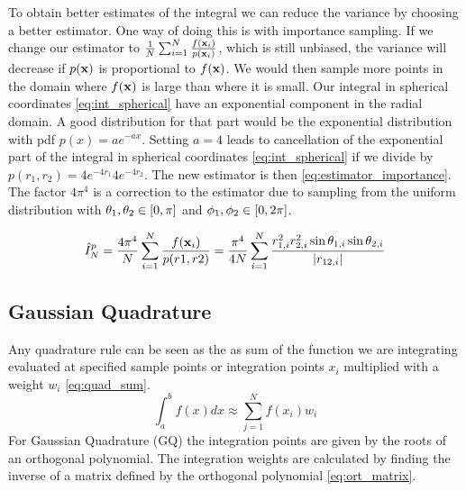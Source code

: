 To obtain better estimates of the integral we can reduce the variance by
choosing a better estimator.
One way of doing this is with importance sampling. If we change our estimator to
$\frac{1}{N} \sum_{i=1}^{N} \frac{f(\mathbf{x}_i)}{p(\mathbf{x}_i)}$, which is still unbiased, the
variance will decrease if $p(\mathbf{x})$ is proportional to $f(\mathbf{x})$. We would then sample
more points in the domain where $f(\mathbf{x})$ is large than where it is small.
Our integral in spherical coordinates \cref{eq:int_spherical} have an exponential
component in the radial domain. A good distribution for that part would be
the exponential distribution with pdf $p(x) = ae^{-ax}$.
Setting $a = 4$ leads to cancellation of the exponential part of the integral in
spherical coordinates \cref{eq:int_spherical} if we divide by
$p(r_1,r_2) = 4e^{-4r_1} 4e^{-4r_2}$. The new estimator is then
\cref{eq:estimator_importance}. The factor $4\pi^4$ is a correction to the estimator due to sampling from the
uniform distribution with $\theta_1, \theta_2 \in \left[0, \pi\right]$ and
$\phi_1, \phi_2 \in \left[0, 2\pi\right]$.

\begin{equation}
  \label{eq:estimator_importance}
  \hat{I}_N^p
  = \frac{4\pi^4}{N} \sum_{i=1}^{N} \frac{f(\mathbf{x}_i)}{p(r1,r2)}
  = \frac{\pi^4}{4N} \sum_{i=1}^{N}
  \frac{r_{1,i}^2 r_{2,i}^2 \sin{\theta_{1,i}} \sin{\theta_{2,i}}}{\abs{r_{12,i}}}
\end{equation}


\subsection{Gaussian Quadrature}
Any quadrature rule can be seen as the as sum of the function we are
integrating evaluated at specified sample points or integration points $x_i$
multiplied with a weight $w_i$ \cref{eq:quad_sum}.
\begin{equation}\label{eq:quad_sum}
  \int_{a}^{b} f(x)dx \approx \sum_{j=1}^{N} f(x_i) w_i
\end{equation}
For Gaussian Quadrature (GQ) the
integration points are given by the roots of an orthogonal polynomial. The
integration weights are calculated by finding the inverse of a matrix defined by
the orthogonal polynomial \cref{eq:ort_matrix}.

